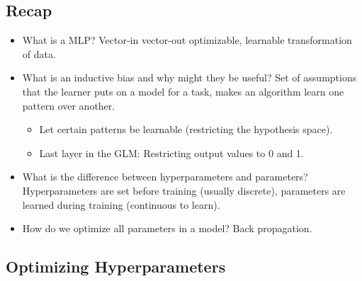 \documentclass{article}
\begin{document}
\subsection{Recap}
\begin{summary}
    \begin{itemize}
        \item What is a MLP? Vector-in vector-out optimizable, learnable transformation of data.
        \item What is an inductive bias and why might they be useful? Set of assumptions that the learner puts on a model for a task, makes an algorithm learn one pattern over another.
        \begin{itemize}
            \item Let certain patterns be learnable (restricting the hypothesis space).
            \item Last layer in the GLM: Restricting output values to 0 and 1. 
        \end{itemize}
        \item What is the difference between hyperparameters and parameters? Hyperparameters are set before training (usually discrete), parameters are learned during training (continuous to learn).
        \item How do we optimize all parameters in a model? Back propagation.
    \end{itemize}
\end{summary}
\newpage

\subsection{Optimizing Hyperparameters}
\begin{summary}
    
\end{summary}
\end{document}
